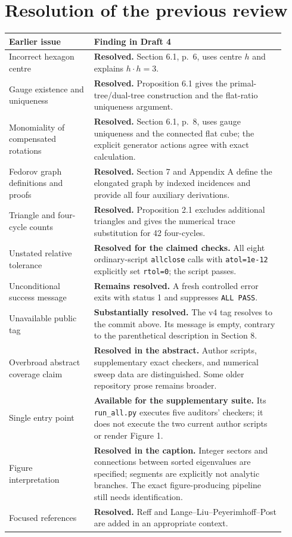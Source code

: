 \documentclass[11pt,a4paper]{article}
\begin{document}
\section{Resolution of the previous review}
\small
\begin{longtable}{>{\raggedright\arraybackslash}p{0.29\linewidth}>{\raggedright\arraybackslash}p{0.63\linewidth}}
\toprule
Earlier issue & Finding in Draft 4\\\midrule
\endhead
Incorrect hexagon centre & \textbf{Resolved.} Section 6.1, p.~6, uses centre $h$ and explains $h\cdot h=3$.\\
Gauge existence and uniqueness & \textbf{Resolved.} Proposition 6.1 gives the primal-tree/dual-tree construction and the flat-ratio uniqueness argument.\\
Monomiality of compensated rotations & \textbf{Resolved.} Section 6.1, p.~8, uses gauge uniqueness and the connected flat cube; the explicit generator actions agree with exact calculation.\\
Fedorov graph definitions and proofs & \textbf{Resolved.} Section 7 and Appendix A define the elongated graph by indexed incidences and provide all four auxiliary derivations.\\
Triangle and four-cycle counts & \textbf{Resolved.} Proposition 2.1 excludes additional triangles and gives the numerical trace substitution for 42 four-cycles.\\
Unstated relative tolerance & \textbf{Resolved for the claimed checks.} All eight ordinary-script \texttt{allclose} calls with \texttt{atol=1e-12} explicitly set \texttt{rtol=0}; the script passes.\\
Unconditional success message & \textbf{Remains resolved.} A fresh controlled error exits with status 1 and suppresses \texttt{ALL PASS}.\\
Unavailable public tag & \textbf{Substantially resolved.} The v4 tag resolves to the commit above. Its message is empty, contrary to the parenthetical description in Section 8.\\
Overbroad abstract coverage claim & \textbf{Resolved in the abstract.} Author scripts, supplementary exact checkers, and numerical sweep data are distinguished. Some older repository prose remains broader.\\
Single entry point & \textbf{Available for the supplementary suite.} Its \texttt{run\_all.py} executes five auditors' checkers; it does not execute the two current author scripts or render Figure 1.\\
Figure interpretation & \textbf{Resolved in the caption.} Integer sectors and connections between sorted eigenvalues are specified; segments are explicitly not analytic branches. The exact figure-producing pipeline still needs identification.\\
Focused references & \textbf{Resolved.} Reff and Lange--Liu--Peyerimhoff--Post are added in an appropriate context.\\
\bottomrule
\end{longtable}
\end{document}
